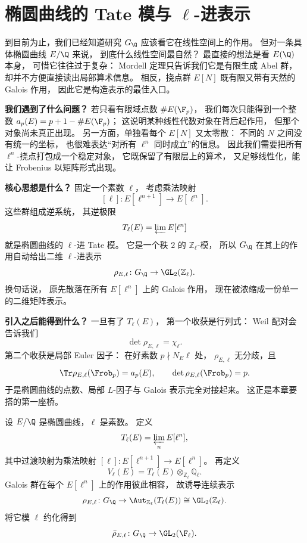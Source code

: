 \section{椭圆曲线的 Tate 模与 $\ell$-进表示}
\label{sec:ch09-tate-module}

\providecommand{\Zl}{\mathbb{Z}_\ell}
\providecommand{\Ql}{\mathbb{Q}_\ell}
\providecommand{\rhobar}{\bar{\rho}}

到目前为止，我们已经知道研究 $G_\Q$ 应该看它在线性空间上的作用。
但对一条具体椭圆曲线 $E/\Q$ 来说，
到底什么线性空间最自然？
最直接的想法是看 $E(\Q)$ 本身，
可惜它往往过于复杂：
Mordell 定理只告诉我们它是有限生成 Abel 群，
却并不方便直接读出局部算术信息。
相反，挠点群 $E[N]$ 既有限又带有天然的 Galois 作用，
因此它是构造表示的最佳入口。

\textbf{我们遇到了什么问题？}
若只看有限域点数 $\#E(\F_p)$，
我们每次只能得到一个整数 $a_p(E)=p+1-\#E(\F_p)$；
这说明某种线性代数对象在背后起作用，
但那个对象尚未真正出现。
另一方面，单独看每个 $E[N]$ 又太零散：
不同的 $N$ 之间没有统一的坐标，
也很难表达“对所有 $\ell^n$ 同时成立”的信息。
因此我们需要把所有 $\ell^n$-挠点打包成一个稳定对象，
它既保留了有限层上的算术，
又足够线性化，能让 Frobenius 以矩阵形式出现。

\textbf{核心思想是什么？}
固定一个素数 $\ell$，
考虑乘法映射
\[
  [\ell]\colon E[\ell^{n+1}]\to E[\ell^n].
\]
这些群组成逆系统，
其逆极限
\[
  T_\ell(E)=\varprojlim E[\ell^n]
\]
就是椭圆曲线的 $\ell$-进 Tate 模。
它是一个秩 $2$ 的 $\Zl$-模，
所以 $G_\Q$ 在其上的作用自动给出二维 $\ell$-进表示
\[
  \rho_{E,\ell}\colon G_\Q\to \GL_2(\Zl).
\]
换句话说，
原先散落在所有 $E[\ell^n]$ 上的 Galois 作用，
现在被浓缩成一份单一的二维矩阵表示。

\textbf{引入之后能得到什么？}
一旦有了 $T_\ell(E)$，
第一个收获是行列式：
Weil 配对会告诉我们
\[
  \det \rho_{E,\ell}=\chi_\ell.
\]
第二个收获是局部 Euler 因子：
在好素数 $p\nmid N_E\ell$ 处，
$\rho_{E,\ell}$ 无分歧，且
\[
  \Tr\rho_{E,\ell}(\Frob_p)=a_p(E),
  \qquad
  \det\rho_{E,\ell}(\Frob_p)=p.
\]
于是椭圆曲线的点数、局部 $L$-因子与 Galois 表示完全对接起来。
这正是本章要搭的第一座桥。



\begin{definition}
设 $E/\Q$ 是椭圆曲线，$\ell$ 是素数。
定义
\[
  T_\ell(E)=\varprojlim_n E[\ell^n],
\]
其中过渡映射为乘法映射 $[\ell]\colon E[\ell^{n+1}]\to E[\ell^n]$。
再定义
\[
  V_\ell(E)=T_\ell(E)\otimes_{\Zl}\Ql.
\]
Galois 群在每个 $E[\ell^n]$ 上的作用彼此相容，
故诱导连续表示
\[
  \rho_{E,\ell}\colon G_\Q\to \Aut_{\Zl}(T_\ell(E))\cong \GL_2(\Zl).
\]
将它模 $\ell$ 约化得到
\[
  \rhobar_{E,\ell}\colon G_\Q\to \GL_2(\F_\ell).
\]
\end{definition}

